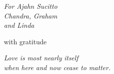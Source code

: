 
\cleartorecto
\thispagestyle{empty}
{\raggedleft\vspace*{3em}\par

\begin{minipage}{5cm}
\itshape
For Ajahn Sucitto\\
Chandra, Graham\\
and Linda

with gratitude
\end{minipage}

\par}

\cleartorecto
\thispagestyle{empty}
{\raggedleft\vspace*{3em}\par

\begin{minipage}{5cm}
\itshape
Love is most nearly itself\\
when here and now cease to matter.\\
\end{minipage}

\par}

